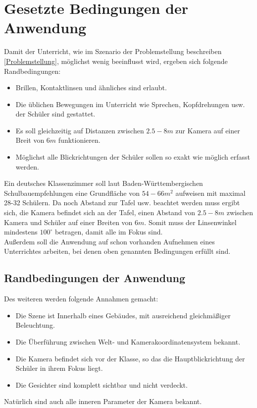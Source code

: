 \section{Gesetzte Bedingungen der Anwendung}
Damit der Unterricht, wie im Szenario der Problemstellung beschreiben \autoref{Problemstellung}, möglichst wenig beeinflusst wird, ergeben sich folgende Randbedingungen:
\begin{itemize}
\item Brillen, Kontaktlinsen und ähnliches sind erlaubt.
\item Die üblichen Bewegungen im Unterricht wie Sprechen, Kopfdrehungen usw. der Schüler sind gestattet.
\item Es soll gleichzeitig auf Distanzen zwischen $2.5 - 8m$ zur Kamera auf einer Breit von $6m$ funktionieren.
\item Möglichst alle Blickrichtungen der Schüler sollen so exakt wie möglich erfasst werden.
\end{itemize}
Ein deutsches Klassenzimmer soll laut Baden-Württembergischen Schulbauempfehlungen eine Grundfläche von $54-66m^2$ aufweisen mit maximal 28-32 Schülern. Da noch Abstand zur Tafel usw. beachtet werden muss ergibt sich, die Kamera befindet sich an der Tafel, einen Abstand von $2.5 - 8m$ zwischen Kamera und Schüler auf einer Breiten von $6m$. Somit muss der Linsenwinkel mindestens $100^\circ$ betragen, damit alle im Fokus sind.\\
Außerdem soll die Anwendung auf schon vorhanden Aufnehmen eines Unterrichtes arbeiten, bei denen oben genannten Bedingungen erfüllt sind.\\
\cite{bauordung}
\subsection{Randbedingungen der Anwendung}
Des weiteren werden folgende Annahmen gemacht:
\begin{itemize}
\item Die Szene ist Innerhalb eines Gebäudes, mit ausreichend gleichmäßiger Beleuchtung.
\item Die Überführung zwischen Welt- und Kamerakoordinatensystem bekannt.
\item Die Kamera befindet sich vor der Klasse, so das die Hauptblickrichtung der Schüler in ihrem Fokus liegt.
\item Die Gesichter sind komplett sichtbar und nicht verdeckt.
\end{itemize}
Natürlich sind auch alle inneren Parameter der Kamera bekannt.